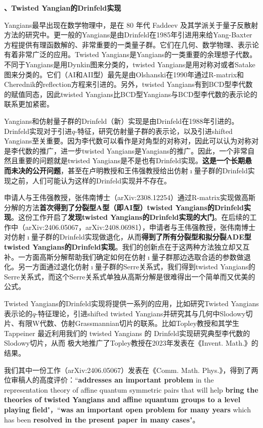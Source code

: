 \documentclass[12pt,UTF8,AutoFakeBold=4,a4paper]{ctexart}
\begin{document}
\medskip

\textbf{、Twisted Yangian的Drinfeld实现}

Yangians最早出现在数学物理中，是在 80 年代 Faddeev 及其学派关于量子反散射方法的研究中。更一般的Yangians是由Drinfeld在1985年引进用来给Yang-Baxter方程提供有理函数解的、非常重要的一类量子群。它们在几何、数学物理、表示论有着非常广泛的应用。Twisted Yangians是Yangians的一类重要的余理想子代数。不同于Yangians是用Dynkin图来分类的，twisted Yangians是用对称对或者Satake图来分类的。它们（AI和AII型）最先是由Olshanski在1990年通过R-matrix和Cherednik的reflection方程来引进的。另外，twisted Yangians有到BCD型李代数的赋值同态，因此twisted Yangians比BCD型Yangians与BCD型李代数的表示论的联系更加紧密。

Yangians和仿射量子群的Drinfeld（新）实现是由Drinfeld在1988年引进的。Drinfeld实现对于引进$q$-特征，研究仿射量子群的表示论，以及引进shifted Yangians至关重要。因为李代数可以看作是对角型的对称对，因此可以认为对称对是李代数的推广，进一步twisted Yangians是Yangians的推广。因此，一个非常自然且重要的问题就是twisted Yangians是不是也有Drinfeld实现。\textbf{这是一个长期悬而未决的公开问题}，甚至在卢明教授和王伟强教授给出仿射$\imath$量子群的Drinfeld实现之前，人们可能认为这样的Drinfeld实现并不存在。

申请人与王伟强教授，张伟南博士（arXiv:2308.12254）通过R-matrix实现做高斯分解的方法\textbf{首次得到了分裂型A型（即AI型）twisted Yangians的Drinfeld实现}。这份工作开启了\textbf{发现twisted Yangians的Drinfeld实现的大门}。在后续的工作中（arXiv:2406.05067，arXiv:2408.06981），申请者与王伟强教授，张伟南博士对仿射$\imath$量子群的Drinfeld实现做退化，从而\textbf{得到了所有分裂型和拟分裂ADE型twisted Yangians的Drinfeld实现}。我们的创新点在于这两种方法独立却又互补。一方面高斯分解帮助我们确定如何在仿射$\imath$量子群那边选取合适的参数做退化。另一方面通过退化仿射$\imath$量子群的Serre关系式，我们得到twisted Yangians的Serre关系式，而这个Serre关系式单独从高斯分解是很难得出一个简单而又优美的公式。

Twisted Yangians的Drinfeld实现将提供一系列的应用，比如研究Twisted Yangians表示论的$q$-特征理论，引进shifted twisted Yangians并研究其与几何中Slodowy切片、有限W代数、仿射Grassmannian切片的联系。比如Topley教授和其学生Tappeiner 最近利用我们的 twisted Yangians 的 Drinfeld实现研究典型李代数的Slodowy切片，从而 极大地推广了Topley教授在2023年发表在《Invent. Math.》的结果。

我们其中一份工作（arXiv:2406.05067）发表在《Comm. Math. Phys.》，得到了两位审稿人的高度评价：``\textbf{addresses an important problem} in the representation theory of affine
quantum symmetric pairs that will help \textbf{bring the theories of twisted Yangians and affine ıquantum groups to a level playing field}"，``\textbf{was an important open problem for many years} which has been \textbf{resolved in the present paper in many cases}"。
\end{document}
